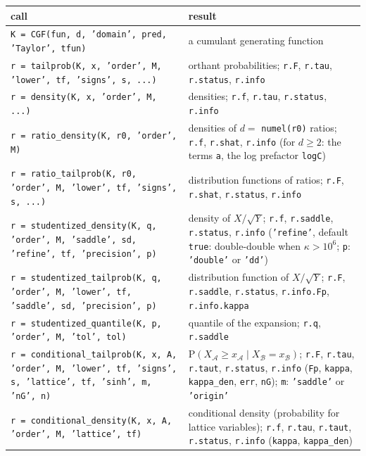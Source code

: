 \documentclass[11pt]{article}
\newcommand{\prog}[1]{\texttt{#1}}
\newcommand{\pr}{\mathrm{P}}
\begin{document}
\begin{longtable}{@{}>{\raggedright\arraybackslash}p{}>{\raggedright\arraybackslash}p{}@{}}
\toprule
call & result\\
\midrule
\endhead
\prog{K = CGF(fun, d, 'domain', pred, 'Taylor', tfun)} & a cumulant generating function\\
\prog{r = tailprob(K, x, 'order', M, 'lower', tf, 'signs', s, ...)} & orthant probabilities; \prog{r.F}, \prog{r.tau}, \prog{r.status}, \prog{r.info}\\
\prog{r = density(K, x, 'order', M, ...)} & densities; \prog{r.f}, \prog{r.tau}, \prog{r.status}, \prog{r.info}\\
\prog{r = ratio\_density(K, r0, 'order', M)} & densities of $d=$ \prog{numel(r0)} ratios; \prog{r.f}, \prog{r.shat}, \prog{r.info} (for $d\geq2$: the terms \prog{a}, the log prefactor \prog{logC})\\
\prog{r = ratio\_tailprob(K, r0, 'order', M, 'lower', tf, 'signs', s, ...)} & distribution functions of ratios; \prog{r.F}, \prog{r.shat}, \prog{r.status}, \prog{r.info}\\
\prog{r = studentized\_density(K, q, 'order', M, 'saddle', sd, 'refine', tf, 'precision', p)} & density of $X/\sqrt Y$; \prog{r.f}, \prog{r.saddle}, \prog{r.status}, \prog{r.info} (\prog{'refine'}, default \prog{true}: double-double when $\kappa>10^6$; \prog{p}: \prog{'double'} or \prog{'dd'})\\
\prog{r = studentized\_tailprob(K, q, 'order', M, 'lower', tf, 'saddle', sd, 'precision', p)} & distribution function of $X/\sqrt Y$; \prog{r.F}, \prog{r.saddle}, \prog{r.status}, \prog{r.info.Fp}, \prog{r.info.kappa}\\
\prog{r = studentized\_quantile(K, p, 'order', M, 'tol', tol)} & quantile of the expansion; \prog{r.q}, \prog{r.saddle}\\
\prog{r = conditional\_tailprob(K, x, A, 'order', M, 'lower', tf, 'signs', s, 'lattice', tf, 'sinh', m, 'nG', n)} & $\pr(X_{\mathcal A}\geq x_{\mathcal A}\mid X_{\mathcal B}=x_{\mathcal B})$; \prog{r.F}, \prog{r.tau}, \prog{r.taut}, \prog{r.status}, \prog{r.info} (\prog{Fp}, \prog{kappa}, \prog{kappa\_den}, \prog{err}, \prog{nG}); \prog{m}: \prog{'saddle'} or \prog{'origin'}\\
\prog{r = conditional\_density(K, x, A, 'order', M, 'lattice', tf)} & conditional density (probability for lattice variables); \prog{r.f}, \prog{r.tau}, \prog{r.taut}, \prog{r.status}, \prog{r.info} (\prog{kappa}, \prog{kappa\_den})\\

\end{longtable}
\end{document}
